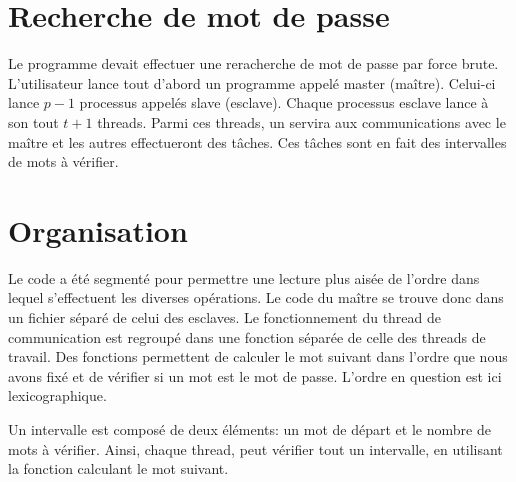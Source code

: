 \section{Recherche de mot de passe} %
\label{sec:recherche_de_mot_de_passe}

Le programme devait effectuer une reracherche de mot de passe par force brute. L'utilisateur lance tout d'abord un programme appelé master (maître). Celui-ci lance $p-1$ processus appelés slave (esclave). Chaque processus esclave lance à son tout $t+1$ threads. Parmi ces threads, un servira aux communications avec le maître et les autres effectueront des tâches. Ces tâches sont en fait des intervalles de mots à vérifier. 


\section{Organisation} %
\label{sec:organisation}

Le code a été segmenté pour permettre une lecture plus aisée de l'ordre dans lequel s'effectuent les diverses opérations. Le code du maître se trouve donc dans un fichier séparé de celui des esclaves. Le fonctionnement du thread de communication est regroupé dans une fonction séparée de celle des threads de travail. Des fonctions permettent de calculer le mot suivant dans l'ordre que nous avons fixé et de vérifier si un mot est le mot de passe. L'ordre en question est ici lexicographique.

Un intervalle est composé de deux éléments: un mot de départ et le nombre de mots à vérifier. Ainsi, chaque thread, peut vérifier tout un intervalle, en utilisant la fonction calculant le mot suivant.
